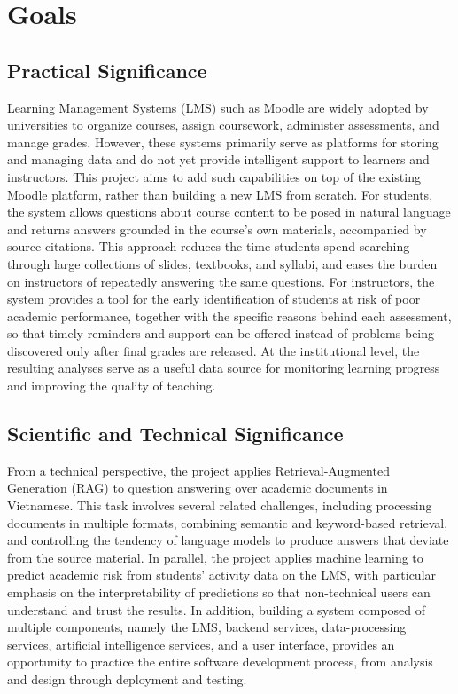 \section{Goals}

\subsection{Practical Significance}
Learning Management Systems (LMS) such as Moodle are widely adopted by universities to organize courses, assign coursework, administer assessments, and manage grades. However, these systems primarily serve as platforms for storing and managing data and do not yet provide intelligent support to learners and instructors. This project aims to add such capabilities on top of the existing Moodle platform, rather than building a new LMS from scratch.
For students, the system allows questions about course content to be posed in natural language and returns answers grounded in the course's own materials, accompanied by source citations. This approach reduces the time students spend searching through large collections of slides, textbooks, and syllabi, and eases the burden on instructors of repeatedly answering the same questions. For instructors, the system provides a tool for the early identification of students at risk of poor academic performance, together with the specific reasons behind each assessment, so that timely reminders and support can be offered instead of problems being discovered only after final grades are released. At the institutional level, the resulting analyses serve as a useful data source for monitoring learning progress and improving the quality of teaching.

\subsection{Scientific and Technical Significance}
From a technical perspective, the project applies Retrieval-Augmented Generation (RAG) to question answering over academic documents in Vietnamese. This task involves several related challenges, including processing documents in multiple formats, combining semantic and keyword-based retrieval, and controlling the tendency of language models to produce answers that deviate from the source material. In parallel, the project applies machine learning to predict academic risk from students' activity data on the LMS, with particular emphasis on the interpretability of predictions so that non-technical users can understand and trust the results.
In addition, building a system composed of multiple components, namely the LMS, backend services, data-processing services, artificial intelligence services, and a user interface, provides an opportunity to practice the entire software development process, from analysis and design through deployment and testing.

